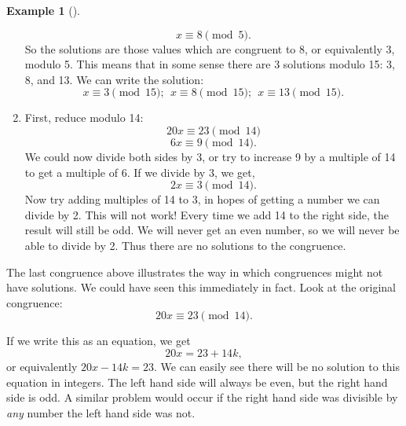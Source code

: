 \documentclass[10pt,]{book}
\theoremstyle{plain}
\theoremstyle{definition}
\newtheorem{example}[theorem]{Example}
\theoremstyle{definition}
\theoremstyle{definition}
\numberwithin{equation}{chapter}
\begin{document}
\begin{example}[]
\begin{enumerate}
\begin{equation*}
  x \equiv 8 \pmod 5.
\end{equation*}
So the solutions are those values which are congruent to 8, or equivalently 3, modulo 5.  This means that in some sense there are 3 solutions modulo 15: 3, 8, and 13.  We can write the solution:
\begin{equation*}
  x \equiv 3 \pmod{15}; ~~ x \equiv 8 \pmod{15}; ~~x \equiv 13 \pmod{15}.
\end{equation*}
%
\item\hypertarget{li-1403}{}
First, reduce modulo 14:
\begin{equation*}
  20x \equiv 23 \pmod{14}
\end{equation*}
\begin{equation*}
  6x \equiv 9 \pmod{14}.
\end{equation*}
We could now divide both sides by 3, or try to increase 9 by a multiple of 14 to get a multiple of 6.  If we divide by 3, we get,
\begin{equation*}
  2x \equiv 3 \pmod{14}.
\end{equation*}
Now try adding multiples of 14 to 3, in hopes of getting a number we can divide by 2.  This will not work!  Every time we add 14 to the right side, the result will still be odd.  We will never get an even number, so we will never be able to divide by 2.  Thus there are no solutions to the congruence.
%
\end{enumerate}
\end{example}
\par

The last congruence above illustrates the way in which congruences might not have solutions. We could have seen this immediately in fact. Look at the original congruence:
\begin{equation*}
  20x \equiv 23 \pmod{14}.
\end{equation*}
%
\par

If we write this as an equation, we get
\begin{equation*}
  20x = 23 + 14k,
\end{equation*}
or equivalently \(20x - 14k = 23\). We can easily see there will be no solution to this equation in integers. The left hand side will always be even, but the right hand side is odd. A similar problem would occur if the right hand side was divisible by \emph{any} number the left hand side was not.
%
\par
\end{document}
